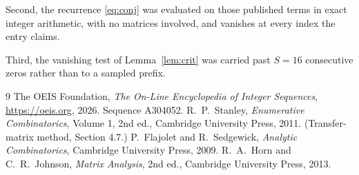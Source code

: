\documentclass[11pt,a4paper]{article}
\theoremstyle{plain}
\theoremstyle{definition}
\begin{document}
Second, the recurrence \eqref{eq:conj} was evaluated on those published terms in exact
integer arithmetic, with no matrices involved, and vanishes at every index the entry claims.

Third, the vanishing test of Lemma~\ref{lem:crit} was carried past $S=16$ consecutive
zeros rather than to a sampled prefix.

\begin{thebibliography}{9}
 The OEIS Foundation, \emph{The On-Line Encyclopedia of Integer
Sequences}, \url{https://oeis.org}, 2026. Sequence A304052.
 R.~P.~Stanley, \emph{Enumerative Combinatorics}, Volume 1, 2nd ed.,
Cambridge University Press, 2011. (Transfer-matrix method, Section 4.7.)
 P.~Flajolet and R.~Sedgewick, \emph{Analytic Combinatorics}, Cambridge
University Press, 2009.
 R.~A.~Horn and C.~R.~Johnson, \emph{Matrix Analysis}, 2nd ed., Cambridge
University Press, 2013.
\end{thebibliography}
\end{document}
